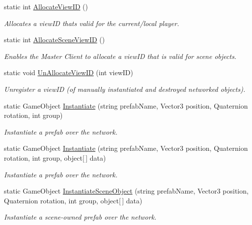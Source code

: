 \begin{DoxyCompactItemize}
static int \hyperlink{class_photon_network_a2eefb7151b27169d11062be9996a0eab}{Allocate\+View\+ID} ()
\begin{DoxyCompactList}\small\item\em Allocates a view\+ID that\textquotesingle{}s valid for the current/local player. \end{DoxyCompactList}\item 
static int \hyperlink{class_photon_network_a8a2bd25668b204f681c7d27174735ba1}{Allocate\+Scene\+View\+ID} ()
\begin{DoxyCompactList}\small\item\em Enables the Master Client to allocate a view\+ID that is valid for scene objects. \end{DoxyCompactList}\item 
static void \hyperlink{class_photon_network_ae5c32625fb17b425e105de49ea267ddf}{Un\+Allocate\+View\+ID} (int view\+ID)
\begin{DoxyCompactList}\small\item\em Unregister a view\+ID (of manually instantiated and destroyed networked objects). \end{DoxyCompactList}\item 
static Game\+Object \hyperlink{class_photon_network_a843d9f62d28ab123c83291c1e6bb857d}{Instantiate} (string prefab\+Name, Vector3 position, Quaternion rotation, int group)
\begin{DoxyCompactList}\small\item\em Instantiate a prefab over the network. \end{DoxyCompactList}\item 
static Game\+Object \hyperlink{class_photon_network_a6dbc821988042fe109d28017cd955c73}{Instantiate} (string prefab\+Name, Vector3 position, Quaternion rotation, int group, object\mbox{[}$\,$\mbox{]} data)
\begin{DoxyCompactList}\small\item\em Instantiate a prefab over the network. \end{DoxyCompactList}\item 
static Game\+Object \hyperlink{class_photon_network_a890353cbe3141ca134a1b0e28aa8ea9f}{Instantiate\+Scene\+Object} (string prefab\+Name, Vector3 position, Quaternion rotation, int group, object\mbox{[}$\,$\mbox{]} data)
\begin{DoxyCompactList}\small\item\em Instantiate a scene-\/owned prefab over the network. \end{DoxyCompactList}\item 

\end{DoxyCompactItemize}

